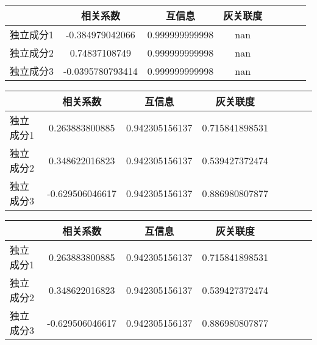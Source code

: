 \begin{table}[!htbp] 
\begin{center}
\begin{tabular}{lccclccc} 
 \toprule 
& 相关系数   & 互信息    &灰关联度 \\ 
\midrule 
独立成分1	& -0.384979042066	& 0.999999999998	& nan	\\ 
独立成分2	& 0.74837108749	& 0.999999999998	& nan	\\ 
独立成分3	& -0.0395780793414	& 0.999999999998	& nan	\\ 
\bottomrule 
 \end{tabular} 
\end{center} 
 \end{table} 


\begin{table}[!htbp] 
\begin{center}
\begin{tabular}{lccclccc} 
 \toprule 
& 相关系数   & 互信息    &灰关联度 \\ 
\midrule 
独立成分1	& 0.263883800885	& 0.942305156137	& 0.715841898531	\\ 
独立成分2	& 0.348622016823	& 0.942305156137	& 0.539427372474	\\ 
独立成分3	& -0.629506046617	& 0.942305156137	& 0.886980807877	\\ 
\bottomrule 
 \end{tabular} 
\end{center} 
 \end{table} 


\begin{table}[!htbp] 
\begin{center}
\begin{tabular}{lccclccc} 
 \toprule 
& 相关系数   & 互信息    &灰关联度 \\ 
\midrule 
独立成分1	& 0.263883800885	& 0.942305156137	& 0.715841898531	\\ 
独立成分2	& 0.348622016823	& 0.942305156137	& 0.539427372474	\\ 
独立成分3	& -0.629506046617	& 0.942305156137	& 0.886980807877	\\ 
\bottomrule 
 \end{tabular} 
\end{center} 
 \end{table} 


